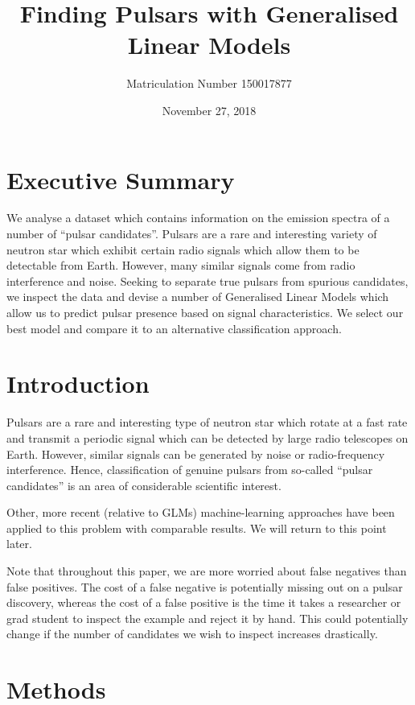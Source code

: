 \documentclass[11pt, oneside]{article}
\title{Finding Pulsars with Generalised Linear Models}
\author{Matriculation Number 150017877}
\date{November 27, 2018}
\begin{document}
\maketitle

\section{Executive Summary}

We analyse a dataset which contains information on the emission spectra of a number of ``pulsar candidates''. Pulsars are a rare and interesting variety of neutron star which exhibit certain radio signals which allow them to be detectable from Earth. However, many similar signals come from radio interference and noise. Seeking to separate true pulsars from spurious candidates, we inspect the data and devise a number of Generalised Linear Models which allow us to predict pulsar presence based on signal characteristics. We select our best model and compare it to an alternative classification approach.  

\section{Introduction}

Pulsars are a rare and interesting type of neutron star which rotate at a fast rate and transmit a periodic signal which can be detected by large radio telescopes on Earth. However, similar signals can be generated by noise or radio-frequency interference. Hence, classification of genuine pulsars from so-called ``pulsar candidates'' is an area of considerable scientific interest.\cite{data}

Other, more recent (relative to GLMs) machine-learning approaches have been applied to this problem with comparable results. We will return to this point later. 

Note that throughout this paper, we are more worried about false negatives than false positives. The cost of a false negative is potentially missing out on a pulsar discovery, whereas the cost of a false positive is the time it takes a researcher or grad student to inspect the example and reject it by hand. This could potentially change if the number of candidates we wish to inspect increases drastically. 

\section{Methods}
\end{document}
